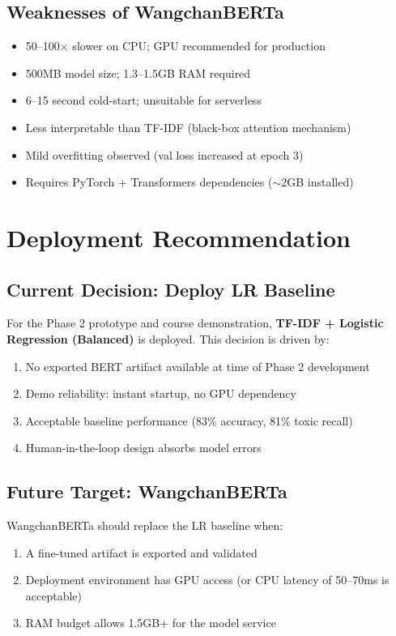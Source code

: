\documentclass[11pt,a4paper]{article}
\begin{document}
\subsection{Weaknesses of WangchanBERTa}
\begin{itemize}[nosep]
    \item 50--100$\times$ slower on CPU; GPU recommended for production
    \item 500MB model size; 1.3--1.5GB RAM required
    \item 6--15 second cold-start; unsuitable for serverless
    \item Less interpretable than TF-IDF (black-box attention mechanism)
    \item Mild overfitting observed (val loss increased at epoch 3)
    \item Requires PyTorch + Transformers dependencies ($\sim$2GB installed)
\end{itemize}

\section{Deployment Recommendation}

\subsection{Current Decision: Deploy LR Baseline}

For the Phase 2 prototype and course demonstration, \textbf{TF-IDF + Logistic Regression (Balanced)}
is deployed. This decision is driven by:

\begin{enumerate}[nosep]
    \item No exported BERT artifact available at time of Phase 2 development
    \item Demo reliability: instant startup, no GPU dependency
    \item Acceptable baseline performance (83\% accuracy, 81\% toxic recall)
    \item Human-in-the-loop design absorbs model errors
\end{enumerate}

\subsection{Future Target: WangchanBERTa}

WangchanBERTa should replace the LR baseline when:
\begin{enumerate}[nosep]
    \item A fine-tuned artifact is exported and validated
    \item Deployment environment has GPU access (or CPU latency of 50--70ms is acceptable)
    \item RAM budget allows 1.5GB+ for the model service
\end{enumerate}
\end{document}
